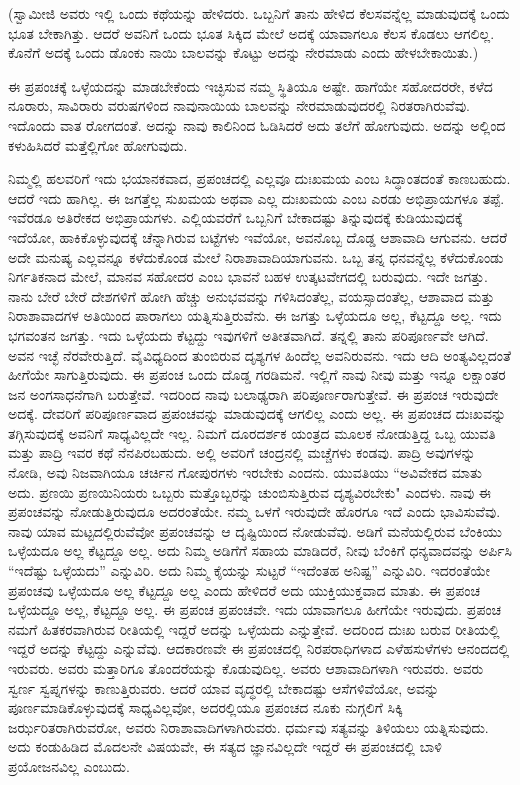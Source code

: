(ಸ್ವಾಮೀಜಿ ಅವರು ಇಲ್ಲಿ ಒಂದು ಕಥೆಯನ್ನು ಹೇಳಿದರು. ಒಬ್ಬನಿಗೆ ತಾನು ಹೇಳಿದ ಕೆಲಸವನ್ನೆಲ್ಲ ಮಾಡುವುದಕ್ಕೆ ಒಂದು ಭೂತ ಬೇಕಾಗಿತ್ತು. ಆದರೆ ಅವನಿಗೆ ಒಂದು ಭೂತ ಸಿಕ್ಕಿದ ಮೇಲೆ ಅದಕ್ಕೆ ಯಾವಾಗಲೂ ಕೆಲಸ ಕೊಡಲು ಆಗಲಿಲ್ಲ. ಕೊನೆಗೆ ಅದಕ್ಕೆ ಒಂದು ಡೊಂಕು ನಾಯಿ ಬಾಲವನ್ನು ಕೊಟ್ಟು ಅದನ್ನು ನೇರಮಾಡು ಎಂದು ಹೇಳಬೇಕಾಯಿತು.)

ಈ ಪ್ರಪಂಚಕ್ಕೆ ಒಳ್ಳೆಯದನ್ನು ಮಾಡಬೇಕೆಂದು ಇಚ್ಛಿಸುವ ನಮ್ಮ ಸ್ಥಿತಿಯೂ ಅಷ್ಟೇ. ಹಾಗೆಯೇ ಸಹೋದರರೇ, ಕಳೆದ ನೂರಾರು, ಸಾವಿರಾರು ವರುಷಗಳಿಂದ ನಾವು\break ನಾಯಿಯ ಬಾಲವನ್ನು ನೇರಮಾಡುವುದರಲ್ಲಿ ನಿರತರಾಗಿರುವೆವು. ಇದೊಂದು ವಾತ ರೋಗದಂತೆ. ಅದನ್ನು ನಾವು ಕಾಲಿನಿಂದ ಓಡಿಸಿದರೆ ಅದು ತಲೆಗೆ ಹೋಗುವುದು. ಅದನ್ನು ಅಲ್ಲಿಂದ ಕಳುಹಿಸಿದರೆ ಮತ್ತೆಲ್ಲಿಗೋ ಹೋಗುವುದು.

ನಿಮ್ಮಲ್ಲಿ ಹಲವರಿಗೆ ಇದು ಭಯಾನಕವಾದ, ಪ್ರಪಂಚದಲ್ಲಿ ಎಲ್ಲವೂ ದುಃಖಮಯ ಎಂಬ ಸಿದ್ಧಾಂತದಂತೆ ಕಾಣಬಹುದು. ಆದರೆ ಇದು ಹಾಗಿಲ್ಲ. ಈ ಜಗತ್ತೆಲ್ಲ ಸುಖಮಯ ಅಥವಾ ಎಲ್ಲ ದುಃಖಮಯ ಎಂಬ ಎರಡು ಅಭಿಪ್ರಾಯಗಳೂ ತಪ್ಪೆ. ಇವೆರಡೂ ಅತಿರೇಕದ ಅಭಿಪ್ರಾಯಗಳು. ಎಲ್ಲಿಯವರೆಗೆ ಒಬ್ಬನಿಗೆ ಬೇಕಾದಷ್ಟು ತಿನ್ನುವುದಕ್ಕೆ ಕುಡಿಯುವುದಕ್ಕೆ ಇದೆಯೋ, ಹಾಕಿಕೊಳ್ಳುವುದಕ್ಕೆ ಚೆನ್ನಾಗಿರುವ ಬಟ್ಟೆಗಳು ಇವೆಯೋ, ಅವನೊಬ್ಬ ದೊಡ್ಡ ಆಶಾವಾದಿ ಆಗುವನು. ಆದರೆ ಅದೇ ಮನುಷ್ಯ ಎಲ್ಲವನ್ನೂ ಕಳೆದುಕೊಂಡ ಮೇಲೆ ನಿರಾಶಾವಾದಿಯಾಗುವನು. ಒಬ್ಬ ತನ್ನ ಧನವನ್ನೆಲ್ಲ ಕಳೆದುಕೊಂಡು ನಿರ್ಗತಿಕನಾದ ಮೇಲೆ, ಮಾನವ ಸಹೋದರ ಎಂಬ ಭಾವನೆ ಬಹಳ ಉತ್ಕಟವೇಗದಲ್ಲಿ ಬರುವುದು. ಇದೇ ಜಗತ್ತು. ನಾನು ಬೇರೆ ಬೇರೆ ದೇಶಗಳಿಗೆ ಹೋಗಿ ಹೆಚ್ಚು ಅನುಭವವನ್ನು ಗಳಿಸಿದಂತೆಲ್ಲ, ವಯಸ್ಸಾದಂತೆಲ್ಲ, ಆಶಾವಾದ ಮತ್ತು ನಿರಾಶಾವಾದಗಳ ಅತಿಯಿಂದ ಪಾರಾಗಲು ಯತ್ನಿಸುತ್ತಿರುವೆನು. ಈ ಜಗತ್ತು ಒಳ್ಳೆಯದೂ ಅಲ್ಲ, ಕೆಟ್ಟದ್ದೂ ಅಲ್ಲ. ಇದು ಭಗವಂತನ ಜಗತ್ತು. ಇದು ಒಳ್ಳೆಯದು ಕೆಟ್ಟದ್ದು ಇವುಗಳಿಗೆ ಅತೀತವಾಗಿದೆ. ತನ್ನಲ್ಲಿ ತಾನು ಪರಿಪೂರ್ಣವೇ ಆಗಿದೆ. ಅವನ ಇಚ್ಛೆ ನೆರವೇರುತ್ತಿದೆ. ವೈವಿಧ್ಯದಿಂದ ತುಂಬಿರುವ ದೃಶ್ಯಗಳ ಹಿಂದೆಲ್ಲ ಅವನಿರುವನು. ಇದು ಆದಿ ಅಂತ್ಯವಿಲ್ಲದಂತೆ ಹೀಗೆಯೇ ಸಾಗುತ್ತಿರುವುದು. ಈ ಪ್ರಪಂಚ ಒಂದು ದೊಡ್ಡ ಗರಡಿಮನೆ. ಇಲ್ಲಿಗೆ ನಾವು ನೀವು ಮತ್ತು ಇನ್ನೂ ಲಕ್ಷಾಂತರ ಜನ ಅಂಗಸಾಧನೆಗಾಗಿ ಬರುತ್ತೇವೆ. ಇದರಿಂದ ನಾವು ಬಲಾಢ್ಯರಾಗಿ ಪರಿಪೂರ್ಣರಾಗುತ್ತೇವೆ. ಈ ಪ್ರಪಂಚ ಇರುವುದೇ ಅದಕ್ಕೆ. ದೇವರಿಗೆ ಪರಿಪೂರ್ಣವಾದ ಪ್ರಪಂಚವನ್ನು ಮಾಡುವುದಕ್ಕೆ ಆಗಲಿಲ್ಲ ಎಂದು ಅಲ್ಲ. ಈ ಪ್ರಪಂಚದ ದುಃಖವನ್ನು ತಗ್ಗಿಸುವುದಕ್ಕೆ ಅವನಿಗೆ ಸಾಧ್ಯವಿಲ್ಲದೇ ಇಲ್ಲ. ನಿಮಗೆ ದೂರದರ್ಶಕ ಯಂತ್ರದ ಮೂಲಕ ನೋಡುತ್ತಿದ್ದ ಒಬ್ಬ ಯುವತಿ ಮತ್ತು ಪಾದ್ರಿ ಇವರ ಕಥೆ ನೆನಪಿರಬಹುದು. ಅಲ್ಲಿ ಅವರಿಗೆ ಚಂದ್ರನಲ್ಲಿ ಮಚ್ಚೆಗಳು ಕಂಡವು. ಪಾದ್ರಿ ಅವುಗಳನ್ನು ನೋಡಿ, ಅವು ನಿಜವಾಗಿಯೂ ಚರ್ಚಿನ ಗೋಪುರಗಳು ಇರಬೇಕು ಎಂದನು. ಯುವತಿಯು “ಅವಿವೇಕದ ಮಾತು ಅದು. ಪ್ರಣಯಿ ಪ್ರಣಯಿನಿಯರು ಒಬ್ಬರು ಮತ್ತೊಬ್ಬರನ್ನು ಚುಂಬಿಸುತ್ತಿರುವ ದೃಶ್ಯವಿರಬೇಕು" ಎಂದಳು. ನಾವು ಈ ಪ್ರಪಂಚವನ್ನು ನೋಡುತ್ತಿರುವುದೂ ಅದರಂತೆಯೇ. ನಮ್ಮ ಒಳಗೆ ಇರುವುದೇ ಹೊರಗೂ ಇದೆ ಎಂದು ಭಾವಿಸುವೆವು. ನಾವು ಯಾವ ಮಟ್ಟದಲ್ಲಿರುವೆವೋ ಪ್ರಪಂಚವನ್ನು ಆ ದೃಷ್ಟಿಯಿಂದ ನೋಡುವೆವು. ಅಡಿಗೆ ಮನೆಯಲ್ಲಿರುವ ಬೆಂಕಿಯು ಒಳ್ಳೆಯದೂ ಅಲ್ಲ ಕೆಟ್ಟದ್ದೂ ಅಲ್ಲ. ಅದು ನಿಮ್ಮ ಅಡಿಗೆಗೆ ಸಹಾಯ ಮಾಡಿದರೆ, ನೀವು ಬೆಂಕಿಗೆ ಧನ್ಯವಾದವನ್ನು ಅರ್ಪಿಸಿ “ಇದೆಷ್ಟು ಒಳ್ಳೆಯದು'' ಎನ್ನುವಿರಿ. ಅದು ನಿಮ್ಮ ಕೈಯನ್ನು ಸುಟ್ಟರೆ “ಇದೆಂತಹ ಅನಿಷ್ಟ'' ಎನ್ನುವಿರಿ. ಇದರಂತೆಯೇ ಪ್ರಪಂಚವು ಒಳ್ಳೆಯದೂ ಅಲ್ಲ ಕೆಟ್ಟದ್ದೂ ಅಲ್ಲ ಎಂದು ಹೇಳಿದರೆ ಅದು ಯುಕ್ತಿಯುಕ್ತವಾದ ಮಾತು. ಈ ಪ್ರಪಂಚ ಒಳ್ಳೆಯದ್ದೂ ಅಲ್ಲ, ಕೆಟ್ಟದ್ದೂ ಅಲ್ಲ. ಈ ಪ್ರಪಂಚ ಪ್ರಪಂಚವೇ. ಇದು ಯಾವಾಗಲೂ ಹೀಗೆಯೇ ಇರುವುದು. ಪ್ರಪಂಚ ನಮಗೆ ಹಿತಕರವಾಗಿರುವ ರೀತಿಯಲ್ಲಿ ಇದ್ದರೆ ಅದನ್ನು ಒಳ್ಳೆಯದು ಎನ್ನುತ್ತೇವೆ. ಅದರಿಂದ ದುಃಖ ಬರುವ ರೀತಿಯಲ್ಲಿ ಇದ್ದರೆ ಅದನ್ನು ಕೆಟ್ಟದ್ದು ಎನ್ನುವೆವು. ಆದಕಾರಣವೇ ಈ ಪ್ರಪಂಚದಲ್ಲಿ ನಿರಪರಾಧಿಗಳಾದ ಎಳೆಹಸುಳೆಗಳು ಆನಂದದಲ್ಲಿ ಇರುವರು. ಅವರು ಮತ್ತಾರಿಗೂ ತೊಂದರೆಯನ್ನು ಕೊಡುವುದಿಲ್ಲ. ಅವರು ಆಶಾವಾದಿಗಳಾಗಿ ಇರುವರು. ಅವರು ಸ್ವರ್ಣ ಸ್ವಪ್ನಗಳನ್ನು ಕಾಣುತ್ತಿರುವರು. ಆದರೆ ಯಾವ ವೃದ್ಧರಲ್ಲಿ ಬೇಕಾದಷ್ಟು ಆಸೆಗಳಿವೆಯೋ, ಅವನ್ನು ಪೂರ್ಣಮಾಡಿಕೊಳ್ಳುವುದಕ್ಕೆ ಸಾಧ್ಯವಿಲ್ಲವೋ, ಅದರಲ್ಲಿಯೂ ಪ್ರಪಂಚದ ನೂಕು ನುಗ್ಗಲಿಗೆ ಸಿಕ್ಕಿ ಜರ್ಝರಿತರಾಗಿರುವರೋ, ಅವರು ನಿರಾಶಾವಾದಿಗಳಾಗಿರುವರು. ಧರ್ಮವು ಸತ್ಯವನ್ನು ತಿಳಿಯಲು ಯತ್ನಿಸುವುದು. ಅದು ಕಂಡುಹಿಡಿದ ಮೊದಲನೇ ವಿಷಯವೇ, ಈ ಸತ್ಯದ ಜ್ಞಾನವಿಲ್ಲದೇ ಇದ್ದರೆ ಈ ಪ್ರಪಂಚದಲ್ಲಿ ಬಾಳಿ ಪ್ರಯೋಜನವಿಲ್ಲ ಎಂಬುದು.

